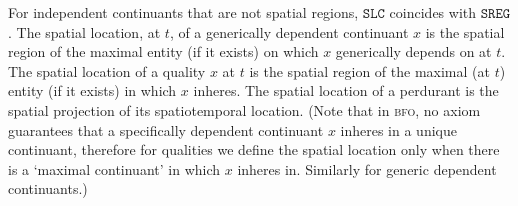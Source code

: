 \documentclass[ao]{iosart2x}
\newcommand{\pr}[1]{\mathtt{#1}}
\newcommand{\bfo}{{\textsc{bfo}}}
\newcommand {\SLCd} {\ensuremath{\pr{SLC}}}
\newcommand{\bfosregof}{\pr{SREG}}
\begin{document}
\vspace{6pt}
For independent continuants that are not spatial regions, $\SLCd$ coincides with $\bfosregof$. The spatial location, at $t$, of a generically dependent continuant $x$ is the spatial region of the maximal entity (if it exists) on which $x$ generically depends on at $t$.  The spatial location of a quality $x$ at $t$ is the spatial region of the maximal (at $t$) entity (if it exists) in which $x$ inheres. The spatial location of a perdurant is the spatial projection of its spatiotemporal location.  
(Note that in {\bfo}, no axiom guarantees that a specifically dependent continuant $x$ inheres in a unique continuant, therefore for qualities we define the spatial location only when there is a `maximal continuant' in which $x$ inheres in. Similarly for generic dependent continuants.)
\end{document}
